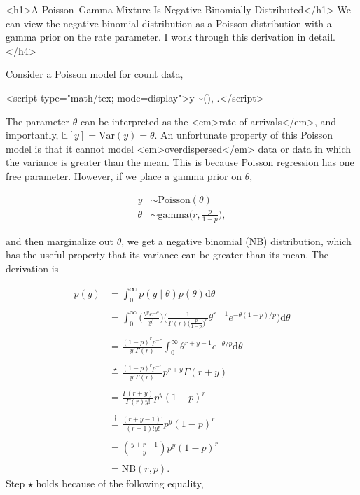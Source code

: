 \documentclass{article}
\begin{document}
           <h1>A Poisson–Gamma Mixture Is Negative-Binomially Distributed</h1>
            We can view the negative binomial distribution as a Poisson distribution with a gamma prior on the rate parameter. I work through this derivation in detail.</h4>

        \noindent Consider a Poisson model for count data,

<script type="math/tex; mode=display">y \sim {}(\theta), \qquad \theta {}.</script>

\noindent The parameter $\theta$ can be interpreted as the <em>rate of arrivals</em>, and importantly, $\mathbb{E}[y] = \text{Var}(y) = \theta$. An unfortunate property of this Poisson model is that it cannot model <em>overdispersed</em> data or data in which the variance is greater than the mean. This is because Poisson regression has one free parameter. However, if we place a gamma prior on $\theta$,

\begin{align}
y &\sim \text{Poisson}(\theta)
\\
\theta &\sim \text{gamma}\Big(r, \frac{p}{1-p}\Big),
\end{align} 

\noindent and then marginalize out $\theta$, we get a negative binomial (NB) distribution, which has the useful property that its variance can be greater than its mean. The derivation is

\begin{align}
p(y)
&= \int_{0}^{\infty} p(y \mid \theta) p(\theta) \text{d} \theta
\\\\
&= \int_{0}^{\infty} \Big( \frac{\theta^{y} e^{-\theta}}{y!} \Big) \Big( \frac{1}{\Gamma(r) \big( \frac{p}{1-p} \big)^r} \theta^{r - 1} e^{-\theta (1-p)/p} \Big) \text{d} \theta
\\\\
&= \frac{(1-p)^r p^{-r}}{y! \Gamma(r)} \int_{0}^{\infty} \theta^{r+y-1} e^{-\theta/p} \text{d} \theta
\\\\
&\stackrel{\star}{=} \frac{(1-p)^r p^{-r}}{y! \Gamma(r)} p^{r+y} \Gamma(r+y)
\\\\
&= \frac{\Gamma(r+y)}{\Gamma(r) y!} p^y (1-p)^r
\\\\
&\stackrel{\dagger}{=} \frac{(r+y-1)!}{(r-1)!y!} p^y (1-p)^r
\\\\
&= {y+r-1 \choose y} p^y (1-p)^r
\\\\
&= \text{NB}(r, p).
\end{align} 
\noindent Step $\star$ holds because of the following equality,
\end{document}
